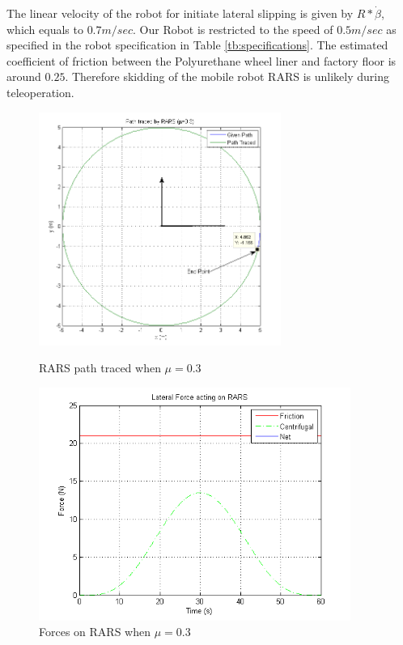 {The linear velocity of the robot for initiate lateral slipping is given by $R*\dot{\beta}$, which equals to $0.7m/sec$. Our Robot is restricted to the speed of $0.5m/sec$ as specified in the robot specification in Table \ref{tb:specifications}. The estimated coefficient of friction between the Polyurethane wheel liner and factory floor is around $0.25$. Therefore skidding of the mobile robot RARS is unlikely during teleoperation. 
\begin{figure}
	\begin{minipage}[t]{0.5\textwidth}
		\centering
		\includegraphics[height=3in]{Chapter4/fig/PathWithMu-3slip}
		\caption{RARS path traced when $\mu=0.3$}\label{fig:pathWithMu3}
	\end{minipage}
	\hfill
	\begin{minipage}[t]{0.5\textwidth}
		\centering
		\includegraphics[height=3in,width=\textwidth]{Chapter4/fig/ForceMu-3}
		\caption{Forces on RARS when $\mu=0.3$ }\label{fig:ForcesMu3}
	\end{minipage}
\end{figure}
\begin{figure}

\end{figure}}
